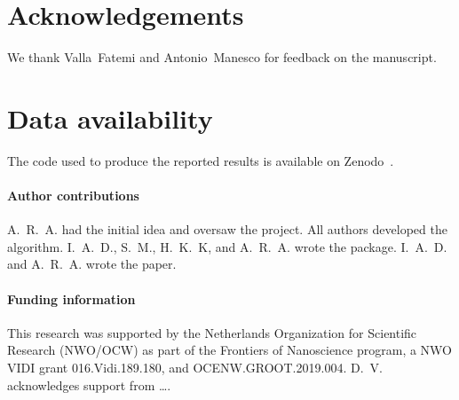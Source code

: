 \section*{Acknowledgements}
We thank Valla~Fatemi and Antonio~Manesco for feedback on the manuscript.

\section*{Data availability}
The code used to produce the reported results is available on Zenodo~\cite{Araya_2024}.

\paragraph{Author contributions}
A.~R.~A. had the initial idea and oversaw the project.
All authors developed the algorithm.
I.~A.~D., S.~M., H.~K.~K, and A.~R.~A. wrote the package.
I.~A.~D. and A.~R.~A. wrote the paper.

\paragraph{Funding information}
This research was supported by the Netherlands Organization for Scientific Research (NWO/OCW) as part of the Frontiers of Nanoscience program, a NWO VIDI grant 016.Vidi.189.180, and OCENW.GROOT.2019.004.
D.~V. acknowledges support from \dots. 
